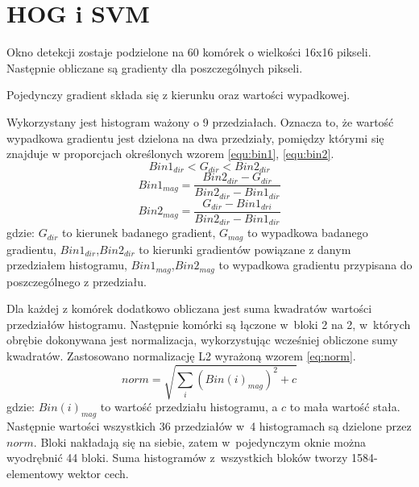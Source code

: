 \section{HOG i SVM}
Okno detekcji zostaje podzielone na 60 komórek o wielkości 16x16 pikseli. %
Następnie obliczane są gradienty dla poszczególnych pikseli. 

Pojedynczy gradient składa się z kierunku oraz wartości wypadkowej.


Wykorzystany jest histogram ważony o 9 przedziałach. 
Oznacza to, że wartość wypadkowa gradientu jest dzielona na dwa przedziały, pomiędzy którymi się znajduje w proporcjach określonych wzorem \eqref{equ:bin1}, \eqref{equ:bin2}.
\begin{equation}\label{equ:bin0}
Bin1_{dir} < G_{dir} < Bin2_{dir}
\end{equation}
\begin{equation}\label{equ:bin1}
Bin1_{mag} = \frac{Bin2_{dir} - G_{dir}}{Bin2_{dir} - Bin1_{dir}}
\end{equation}
\begin{equation}\label{equ:bin2}
Bin2_{mag} = \frac{G_{dir}- Bin1_{dri}}{Bin2_{dir} - Bin1_{dir}}
\end{equation}
\noindent gdzie: $G_{dir}$ to kierunek badanego gradient, $G_{mag}$ to wypadkowa badanego gradientu, $Bin1_{dir}$,$Bin2_{dir}$ to kierunki gradientów powiązane z danym przedziałem histogramu, $Bin1_{mag}$,$Bin2_{mag}$ to wypadkowa gradientu przypisana do poszczególnego z przedziału.

Dla każdej z komórek dodatkowo obliczana jest suma kwadratów wartości przedziałów histogramu.
Następnie komórki są łączone w~bloki 2 na 2, w~których obrębie dokonywana jest normalizacja, wykorzystując wcześniej obliczone sumy kwadratów. 
Zastosowano normalizację L2 wyrażoną wzorem \eqref{eq:norm}.
\begin{equation}\label{eq:norm}
norm = \sqrt{\sum_{i} (Bin(i)_{mag})^2 + c}
\end{equation}
\noindent gdzie: $Bin(i)_{mag}$ to wartość przedziału histogramu, a $c$ to mała wartość stała.
Następnie wartości wszystkich 36 przedziałów w~4 histogramach są dzielone przez $norm$.
Bloki nakładają się na siebie, zatem w~pojedynczym oknie można wyodrębnić 44 bloki. 
Suma histogramów z~wszystkich bloków tworzy 1584-elementowy wektor cech.

